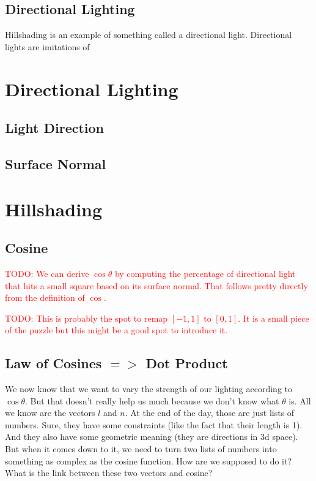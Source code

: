 \documentclass{article}
\newcommand\todo[1]{\textcolor{red}{TODO: #1}}
\begin{document}
\subsection{Directional Lighting}

Hillshading is an example of something called a directional light.
Directional lights are imitations of 

\section{Directional Lighting}

\subsection{Light Direction}

\subsection{Surface Normal}

\section{Hillshading}

\subsection{Cosine}

\todo{We can derive $\cos \theta$ by computing the percentage of directional light that hits a small square based on its surface normal.
That follows pretty directly from the definition of $\cos$.}

\todo{This is probably the spot to remap $[-1, 1]$ to $[0, 1]$. It is a small piece of the puzzle but this might be a good spot to introduce it.}

\subsection{Law of Cosines $=>$ Dot Product}

We now know that we want to vary the strength of our lighting according to $\cos \theta$.
But that doesn't really help us much because we don't know what $\theta$ is.
All we know are the vectors $l$ and $n$.
At the end of the day, those are just lists of numbers.
Sure, they have some constraints (like the fact that their length is 1).
And they also have some geometric meaning (they are directions in 3d space).
But when it comes down to it, we need to turn two lists of numbers into something as complex as the cosine function.
How are we supposed to do it?
What is the link between these two vectors and cosine?
\end{document}
